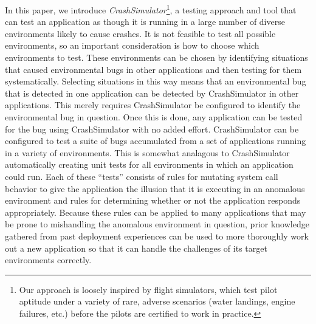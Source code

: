 In this paper, we introduce {\em CrashSimulator}\footnote{
Our approach is loosely inspired by flight simulators, which test pilot
aptitude under a variety of rare, adverse scenarios (water landings, 
engine failures, etc.) before the pilots are certified to work in practice.}, 
a testing approach
and tool that can test an application as though it is running in a large number
of diverse environments likely to cause crashes.  It is not 
feasible to test all possible environments, so an important consideration
is how to choose which environments to test.  These environments can be chosen
by  identifying 
situations that caused environmental bugs in other applications and then
testing for them systematically.
Selecting situations in this way means that an environmental bug that is detected in one application can be 
detected by CrashSimulator in other applications. 
This merely requires CrashSimulator be configured to identify the environmental
bug in question.
Once this is done, any application can
be tested for the bug using CrashSimulator with no added effort.  CrashSimulator
can be configured to test a suite of bugs accumulated from a set of applications
running in a variety of environments.
This is somewhat analagous to
CrashSimulator automatically creating unit tests for all environments
in which an application could run.
Each of these ``tests'' consists of rules for
mutating system call behavior to give the application the illusion that it is
executing in an anomalous environment and rules for determining whether or not
the application responds appropriately.
Because these rules can be applied to many
applications that may be prone to mishandling the
anomalous environment in question, prior knowledge
gathered from past deployment experiences can be used to more thoroughly work
out a new application so that it can
handle the challenges of its target environments correctly.




